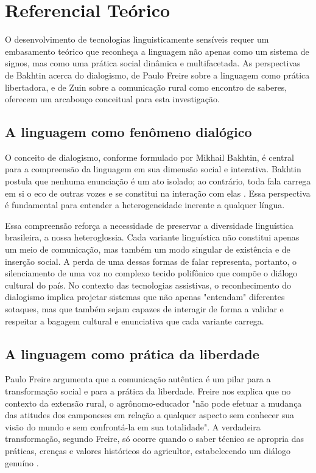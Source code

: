 \chapter{Referencial Teórico}

O desenvolvimento de tecnologias linguisticamente sensíveis requer um embasamento teórico que reconheça a linguagem não apenas como um sistema de signos, mas como uma prática social dinâmica e multifacetada. As perspectivas de Bakhtin acerca do dialogismo, de Paulo Freire  sobre a linguagem como prática libertadora, e de Zuin sobre a comunicação rural como encontro de saberes, oferecem um arcabouço conceitual para esta investigação.

\section{A linguagem como fenômeno dialógico}
O conceito de dialogismo, conforme formulado por Mikhail Bakhtin, é central para a compreensão da linguagem em sua dimensão social e interativa. Bakhtin postula que nenhuma enunciação é um ato isolado; ao contrário, toda fala carrega em si o eco de outras vozes e se constitui na interação com elas \cite{bakhtin1997estetica}. Essa perspectiva é fundamental para entender a heterogeneidade inerente a qualquer língua.


Essa compreensão reforça a necessidade de preservar a diversidade linguística brasileira, a nossa heteroglossia. Cada variante linguística não constitui apenas um meio de comunicação, mas também um modo singular de existência e de inserção social. A perda de uma dessas formas de falar representa, portanto, o silenciamento de uma voz no complexo tecido polifônico que compõe o diálogo cultural do país. No contexto das tecnologias assistivas, o reconhecimento do dialogismo implica projetar sistemas que não apenas "entendam" diferentes sotaques, mas que também sejam capazes de interagir de forma a validar e respeitar a bagagem cultural e enunciativa que cada variante carrega.



\section{A linguagem como prática da liberdade}


Paulo Freire argumenta que a comunicação autêntica é um pilar para a transformação social e para a prática da liberdade. Freire nos explica que no contexto da extensão rural, o agrônomo-educador "não pode efetuar a mudança das atitudes dos camponeses em relação a qualquer aspecto sem conhecer sua visão do mundo e sem confrontá-la em sua totalidade". A verdadeira transformação, segundo Freire, só ocorre quando o saber técnico se apropria das práticas, crenças e valores históricos do agricultor, estabelecendo um diálogo genuíno \cite{freire2013extensao}.

